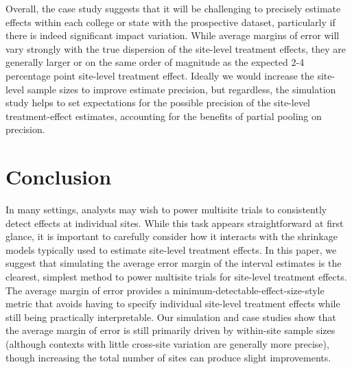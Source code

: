 \documentclass[]{article}
\begin{document}
Overall, the case study suggests that it will be challenging to precisely estimate effects within each college or state with the prospective dataset, particularly if there is indeed significant impact variation.
While average margins of error will vary strongly with the true dispersion of the site-level treatment effects, they are generally larger or on the same order of magnitude as the expected 2-4 percentage point site-level treatment effect.
Ideally we would increase the site-level sample sizes to improve estimate precision, but regardless, the simulation study helps to set expectations for the possible precision of the site-level treatment-effect estimates, accounting for the benefits of partial pooling on precision.

\section{Conclusion}

In many settings, analysts may wish to power multisite trials to consistently detect effects at individual sites.
While this task appears straightforward at first glance, it is important to carefully consider how it interacts with the shrinkage models typically used to estimate site-level treatment effects.
In this paper, we suggest that simulating the average error margin of the interval estimates is the clearest, simplest method to power multisite trials for site-level treatment effects.
The average margin of error provides a minimum-detectable-effect-size-style metric that avoids having to specify individual site-level treatment effects while still being practically interpretable.
Our simulation and case studies show that the average margin of error is still primarily driven by within-site sample sizes (although contexts with little cross-site variation are generally more precise), though increasing the total number of sites can produce slight improvements.



	
\end{document}
